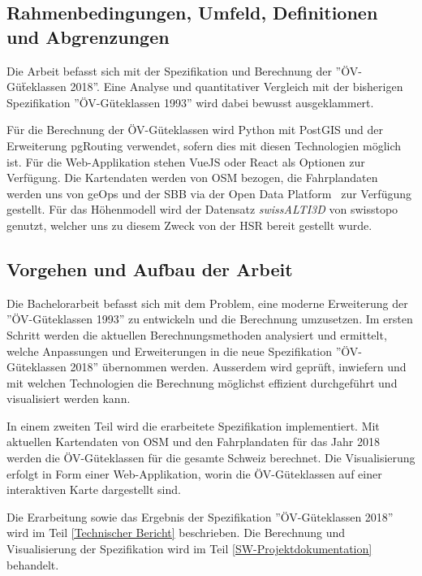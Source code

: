 \subsection{Rahmenbedingungen, Umfeld, Definitionen und Abgrenzungen}
\label{Einführung:Rahmenbedingungen, Umfeld, Definitionen, Abgrenzungen}

Die Arbeit befasst sich mit der Spezifikation und Berechnung der ''ÖV-Güẗeklassen 2018''.
Eine Analyse und quantitativer Vergleich mit der bisherigen Spezifikation ''ÖV-Güteklassen 1993'' wird dabei bewusst ausgeklammert.

Für die Berechnung der ÖV-Güteklassen wird Python mit PostGIS und der Erweiterung pgRouting verwendet, sofern dies mit diesen Technologien möglich ist.
Für die Web-Applikation stehen VueJS oder React als Optionen zur Verfügung. Die Kartendaten werden von \ac{OSM} bezogen, die Fahrplandaten werden uns von geOps und der SBB via der Open Data Platform~\cite{sbb_open_transport_data} zur Verfügung gestellt.
Für das Höhenmodell wird der Datensatz \emph{swissALTI3D} von swisstopo~\cite{swissalti3d_swisstopo} genutzt, welcher uns zu diesem Zweck von der HSR bereit gestellt wurde.

\subsection{Vorgehen und Aufbau der Arbeit}
\label{Einführung:Vorgehen und Aufbau der Arbeit}

Die Bachelorarbeit befasst sich mit dem Problem, eine moderne Erweiterung der ''\acs{ÖV}-Güteklassen 1993'' zu entwickeln und die Berechnung umzusetzen.
Im ersten Schritt werden die aktuellen Berechnungsmethoden analysiert und ermittelt, welche Anpassungen und Erweiterungen in die neue Spezifikation ''\acs{ÖV}-Güteklassen 2018'' übernommen werden.
Ausserdem wird geprüft, inwiefern und mit welchen Technologien die Berechnung möglichst effizient durchgeführt und visualisiert werden kann.

In einem zweiten Teil wird die erarbeitete Spezifikation implementiert.
Mit aktuellen Kartendaten von \ac{OSM} und den Fahrplandaten für das Jahr 2018 werden die \acs{ÖV}-Güteklassen für die gesamte Schweiz berechnet.
Die Visualisierung erfolgt in Form einer Web-Applikation, worin die \acs{ÖV}-Güteklassen auf einer interaktiven Karte dargestellt sind.

Die Erarbeitung sowie das Ergebnis der Spezifikation ''\acs{ÖV}-Güteklassen 2018'' wird im Teil \ref{Technischer Bericht} beschrieben.
Die Berechnung und Visualisierung der Spezifikation wird im Teil \ref{SW-Projektdokumentation} behandelt.

